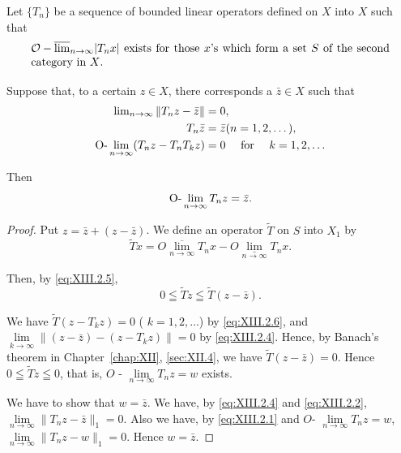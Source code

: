 Let $\{T_n\}$ be a sequence of bounded linear operators defined on $X$ into $X$ such that 
\begin{equation}\label{eq:XIII.2.3}
\begin{minipage}[b]{0.92\linewidth}
$\underset {n \rightarrow \infty} {\mathcal {O} - \varlimsup} | T _{n} x |$ exists for those $x$'s which form a set $S$ of the second category in $X$.
\end{minipage}
\end{equation}


Suppose that, to a certain $z \in X$, there corresponds a $\bar{z} \in X$ such that 
\begin{align}
\lim\nolimits _{n \rightarrow \infty} \| T _{n} z - \bar {z} \|& = 0, \label{eq:XIII.2.4} \\
T _{n} \bar {z}& = \bar {z} (n = 1, 2, \dots), \label{eq:XIII.2.5} \\
\text{O-}\lim _{n \to \infty} (T _{n} z - T _{n} T _{k} z)& = 0 \quad \text{ for } \quad k = 1, 2, \dots \label{eq:XIII.2.6}
\end{align}

Then 
\begin{equation}\label{eq:XIII.2.7}
\text{O-}\lim _{n \to \infty} T _{n} z = \bar {z}.
\end{equation}

\begin{proof}
 Put $z = \bar{z} + (z - \bar{z})$. We define an operator $\tilde{T}$ on $S$ into $X_{1}$ by 
\begin{equation}\label{eq:XIII.2.8}
\tilde {T} x = O \underset {n \rightarrow \infty} {\overline {{\lim}}} T _{n} x - O \underset {n \rightarrow \infty} {\underline {{\lim}}} T _{n} x. \end{equation}

Then, by \eqref{eq:XIII.2.5}, 
\begin{equation*}
0 \leqq \tilde {T} z \leqq \tilde {T} (z - \bar {z}).
\end{equation*}

We have $\tilde{T}(z - T_k z) = 0$ ( $k = 1, 2, \ldots$) by \eqref{eq:XIII.2.6}, and $\lim\limits_{k \to \infty} \|(z - \bar{z}) - (z - T_k z)\| = 0$ by \eqref{eq:XIII.2.4}. Hence, by Banach's theorem in Chapter~\ref{chap:XII}, \ref{sec:XII.4}, we have $\tilde{T}(z - \bar{z}) = 0$. Hence $0 \leqq \tilde{T} z \leqq 0$, that is, $O$ - $\lim\limits_{n \to \infty} T_n z = w$ exists. 

We have to show that $w = \bar{z}$. We have, by \eqref{eq:XIII.2.4} and \eqref{eq:XIII.2.2}, $\lim\limits_{n\to \infty}\|T_n z - \bar{z}\|_1 = 0$. Also we have, by \eqref{eq:XIII.2.1} and $O\text{- }\lim\limits_{n\to \infty}T_n z = w$, $\lim\limits_{n\to \infty}\|T_n z - w\|_1 = 0$. Hence $w = \bar{z}$. 
\end{proof}

